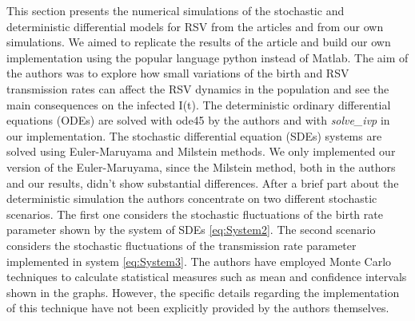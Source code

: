 This section presents the numerical simulations of the stochastic and deterministic differential models for RSV from the articles and from our own simulations. We aimed to replicate the results of the  article and build our own implementation using the popular language python instead of Matlab. The aim of the authors was to explore how small variations of the birth and RSV transmission rates can affect the RSV dynamics in the population and see the main consequences on the infected I(t).
The deterministic ordinary differential equations (ODEs) are solved with ode45 by the authors and with \textit{solve\_ivp} in our implementation. The stochastic differential equation (SDEs) systems are solved using Euler-Maruyama and Milstein methods. We only implemented our version of the Euler-Maruyama, since the Milstein method, both in the authors and our results, didn't show substantial differences.
After a brief part about the deterministic simulation  the authors concentrate on two different stochastic scenarios. The first one considers the stochastic fluctuations of the birth rate parameter shown by the system of SDEs \ref{eq:System2}. The second scenario considers the stochastic fluctuations of the transmission rate parameter implemented in system \ref{eq:System3}. The authors have employed Monte Carlo techniques to calculate statistical measures such as mean and confidence intervals shown in the graphs. However, the specific details regarding the implementation of this technique have not been explicitly provided by the authors themselves.